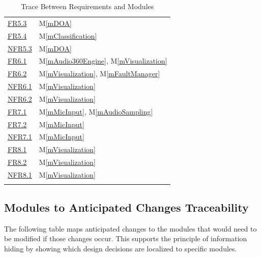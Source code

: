\documentclass[12pt, titlepage]{article}
\newcommand{\mref}[1]{M\ref{#1}}
\begin{document}
\begin{longtable}{p{} p{}}
\hyperref[SRS-FR5_3]{FR5.3} & \mref{mDOA} \\
\hyperref[SRS-FR5_4]{FR5.4} & \mref{mClassification}\\
\hyperref[SRS-NFR5_3]{NFR5.3} & \mref{mDOA} \\
\hline
\hyperref[SRS-FR6_1]{FR6.1} & \mref{mAudio360Engine}, \mref{mVisualization} \\
\hyperref[SRS-FR6_2]{FR6.2} & \mref{mVisualization}, \mref{mFaultManager} \\
\hyperref[SRS-NFR6_1]{NFR6.1} & \mref{mVisualization} \\
\hyperref[SRS-NFR6_2]{NFR6.2} & \mref{mVisualization} \\
\hline
\hyperref[SRS-FR7_1]{FR7.1} & \mref{mMicInput}, \mref{mAudioSampling} \\
\hyperref[SRS-FR7_2]{FR7.2} & \mref{mMicInput} \\
\hyperref[SRS-NFR7_1]{NFR7.1} & \mref{mMicInput} \\
\hline
\hyperref[SRS-FR8_1]{FR8.1} & \mref{mVisualization} \\
\hyperref[SRS-FR8_2]{FR8.2} & \mref{mVisualization} \\
\hyperref[SRS-NFR8_1]{NFR8.1} & \mref{mVisualization} \\
\bottomrule
\caption{Trace Between Requirements and Modules}
\label{TblRT}
\end{longtable}


\subsection{Modules to Anticipated Changes Traceability}

The following table maps anticipated changes to the modules that would need to
be modified if those changes occur. This supports the principle of information
hiding by showing which design decisions are localized to specific modules.
\end{document}
